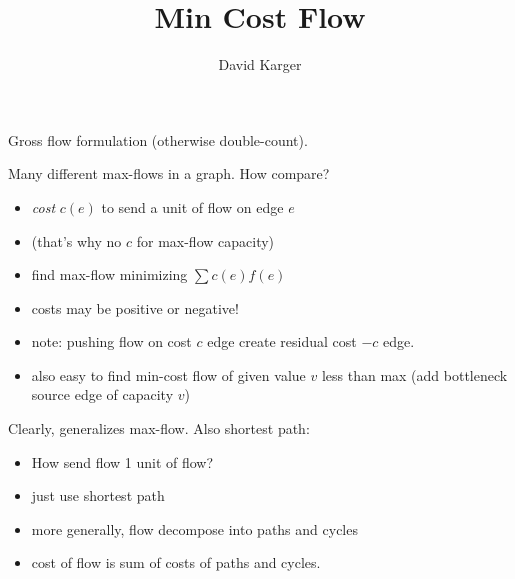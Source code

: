 \documentclass{article}
\title{Min Cost Flow}
\author{David Karger}
\begin{document}
  Gross flow formulation (otherwise double-count).

  Many different max-flows in a graph.  How compare?
  \begin{itemize}
  \item {\em cost} $c(e)$ to send a unit of flow on edge $e$
  \item (that's why no $c$ for max-flow capacity)
  \item find max-flow minimizing $\sum c(e)f(e)$
  \item costs may be positive or negative!
  \item note: pushing flow on cost $c$ edge create residual cost $-c$
    edge.
  \item also easy to find min-cost flow of given value $v$ less than max
    (add bottleneck source edge of capacity $v$)
  \end{itemize}

  Clearly, generalizes max-flow.  Also shortest path:
  \begin{itemize}
  \item How send flow 1 unit of flow?
  \item just use shortest path
  \item more generally, flow decompose into paths and cycles
  \item cost of flow is sum of costs of paths and cycles.
  \end{itemize}

\end{document}
